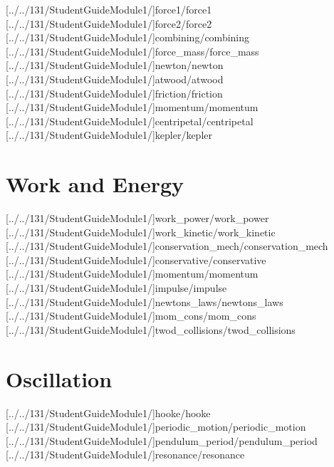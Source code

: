 \documentclass[english,twoside]{article}
\begin{document}
[../../131/StudentGuideModule1/]{force1/force1} %
[../../131/StudentGuideModule1/]{force2/force2}
[../../131/StudentGuideModule1/]{combining/combining}
[../../131/StudentGuideModule1/]{force_mass/force_mass}
[../../131/StudentGuideModule1/]{newton/newton}
[../../131/StudentGuideModule1/]{atwood/atwood}
[../../131/StudentGuideModule1/]{friction/friction}
[../../131/StudentGuideModule1/]{momentum/momentum} %
[../../131/StudentGuideModule1/]{centripetal/centripetal}
[../../131/StudentGuideModule1/]{kepler/kepler}

\part{Work and Energy}

[../../131/StudentGuideModule1/]{work_power/work_power} %
[../../131/StudentGuideModule1/]{work_kinetic/work_kinetic} %
[../../131/StudentGuideModule1/]{conservation_mech/conservation_mech}
[../../131/StudentGuideModule1/]{conservative/conservative} %
[../../131/StudentGuideModule1/]{momentum/momentum} %
[../../131/StudentGuideModule1/]{impulse/impulse} %
[../../131/StudentGuideModule1/]{newtons_laws/newtons_laws} %
[../../131/StudentGuideModule1/]{mom_cons/mom_cons}
[../../131/StudentGuideModule1/]{twod_collisions/twod_collisions}

\part{Oscillation}

[../../131/StudentGuideModule1/]{hooke/hooke}
[../../131/StudentGuideModule1/]{periodic_motion/periodic_motion}
[../../131/StudentGuideModule1/]{pendulum_period/pendulum_period}
[../../131/StudentGuideModule1/]{resonance/resonance}

\end{document}
